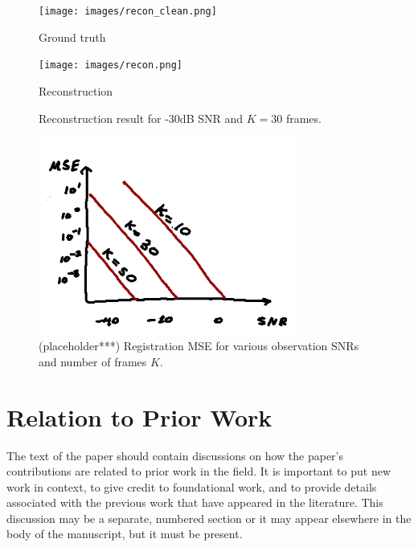 \documentclass{article}
\begin{document}
\begin{figure}[htb]
\begin{minipage}[b]{.48\linewidth}
  \centering
  \centerline{\texttt{[image: images/recon\_clean.png]}}
  \centerline{Ground truth}\medskip
\end{minipage}
\hfill
\begin{minipage}[b]{0.48\linewidth}
  \centering
  \centerline{\texttt{[image: images/recon.png]}}
  \centerline{Reconstruction}\medskip
\end{minipage}
  \caption{Reconstruction result for -30dB SNR and $K=30$ frames.}
\label{fig:scene}
\end{figure}

\begin{figure}[htb]
  \begin{minipage}[b]{1\linewidth}
    \centering
    \centerline{\includegraphics[width=8.5cm]{images/mse.png}}
  \end{minipage}
  \caption{(placeholder***) Registration MSE for various observation SNRs and number of frames $K$.}
  \label{fig:mse}
\end{figure}

\section{Relation to Prior Work}
\label{sec:prior}

The text of the paper should contain discussions on how the paper's
contributions are related to prior work in the field. It is important
to put new work in  context, to give credit to foundational work, and
to provide details associated with the previous work that have appeared
in the literature. This discussion may be a separate, numbered section
or it may appear elsewhere in the body of the manuscript, but it must
be present.
\end{document}
